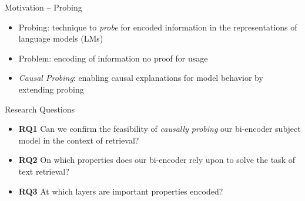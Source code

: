 \documentclass[aspectratio=169]{beamer}
\begin{document}
\begin{frame}{Motivation -- Probing}
    \begin{itemize}
        \item Probing: technique to \textit{probe} for encoded information in the representations of language models (LMs) \cite{Tenney__Probing_for_Sentence_Structure_in_Contextualized_Word_Representations,Conneau__What_you_can_cram_into_a_single_vector,Adi__Fine-grained_Analysis_of_Sentence_Embeddings_Using_Auxilliary_Prediction}
    \end{itemize}
    \begin{figure}[!ht]
        \centering
    \end{figure}
    \begin{itemize}
        \item Problem: encoding of information no proof for usage \cite{Ravichander__Probing_the_Probing_Paradigm}
        \item \textit{Causal Probing}: enabling causal explanations for model behavior by extending probing \cite{Elazar__Amnesic_Probing}
    \end{itemize}
\end{frame}

\begin{frame}{Research Questions}
    \begin{itemize}
        \item \textbf{RQ1} Can we confirm the feasibility of \textit{causally probing} our bi-encoder subject model in the context of retrieval?
        \item \textbf{RQ2} On which properties does our bi-encoder rely upon to solve the task of text retrieval?
        \item \textbf{RQ3} At which layers are important properties encoded?
    \end{itemize}
\end{frame}
\end{document}
